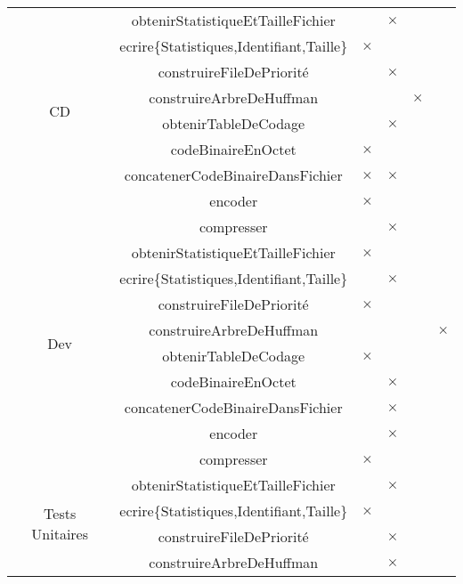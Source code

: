 \begin{table}[ht]
\begin{tabular}{|c|c|>{\centering\arraybackslash}p{1.5cm}|>{\centering\arraybackslash}p{1.5cm}|>{\centering\arraybackslash}p{1.5cm}|>{\centering\arraybackslash}p{1.5cm}|}
        \hline
        \multirow{8}{*}{CD}
        & obtenirStatistiqueEtTailleFichier & & $\times$ & & \\
        \cline{2-6}
        & ecrire\{Statistiques,Identifiant,Taille\} & $\times$ & & & \\ 
        \cline{2-6}
        & construireFileDePriorité & & $\times$ & &\\
        \cline{2-6}
        & construireArbreDeHuffman & & & $\times$ & \\
        \cline{2-6}
        & obtenirTableDeCodage & & $\times$ & & \\
        \cline{2-6}
        & codeBinaireEnOctet & $\times$ & & & \\
        \cline{2-6}
        & concatenerCodeBinaireDansFichier & $\times$ & $\times$ & & \\
        \cline{2-6}
        & encoder & $\times$ & & & \\
        \cline{2-6}
        & compresser & & $\times$ & &\\
        \hline
        \multirow{8}{*}{Dev}
        & obtenirStatistiqueEtTailleFichier & $\times$ & & & \\
        \cline{2-6}
        & ecrire\{Statistiques,Identifiant,Taille\} & & $\times$ & & \\ 
        \cline{2-6}
        & construireFileDePriorité & $\times$ & & & \\
        \cline{2-6}
        & construireArbreDeHuffman & & & & $\times$ \\
        \cline{2-6}
        & obtenirTableDeCodage & $\times$ & & & \\
        \cline{2-6}
        & codeBinaireEnOctet & & $\times$ & & \\
        \cline{2-6}
        & concatenerCodeBinaireDansFichier & & $\times$ & & \\
        \cline{2-6}
        & encoder & & $\times$ & & \\
        \cline{2-6}
        & compresser & $\times$ & & & \\
        \hline
        \multirow{8}{*}{Tests Unitaires}
        & obtenirStatistiqueEtTailleFichier & & $\times$ & & \\
        \cline{2-6}
        & ecrire\{Statistiques,Identifiant,Taille\} & $\times$ & & & \\ 
        \cline{2-6}
        & construireFileDePriorité & & $\times$ & & \\
        \cline{2-6}
        & construireArbreDeHuffman & & $\times$ & & \\

\end{tabular}
\end{table}
